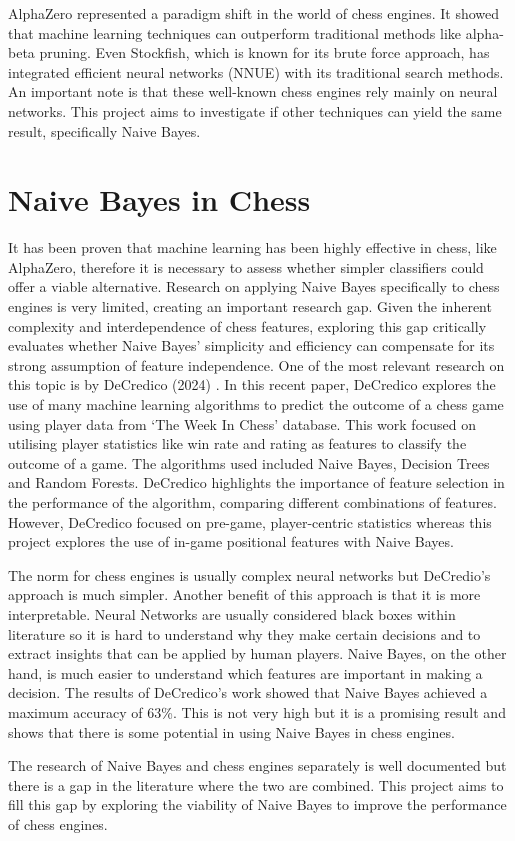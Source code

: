 AlphaZero represented a paradigm shift in the world of chess engines. It showed that machine learning techniques can outperform traditional methods like alpha-beta pruning. Even Stockfish, which is known for its brute force approach, has integrated efficient neural networks (NNUE) with its traditional search methods. An important note is that these well-known chess engines rely mainly on neural networks. This project aims to investigate if other techniques can yield the same result, specifically Naive Bayes. 


\section{Naive Bayes in Chess}

It has been proven that machine learning has been highly effective in chess, like AlphaZero, therefore it is necessary to assess whether simpler classifiers could offer a viable alternative. Research on applying Naive Bayes specifically to chess engines is very limited, creating an important research gap. Given the inherent complexity and interdependence of chess features, exploring this gap critically evaluates whether Naive Bayes' simplicity and efficiency can compensate for its strong assumption of feature independence. One of the most relevant research on this topic is by DeCredico (2024) \cite{decredicoUsingMachineLearning}. In this recent paper, DeCredico explores the use of many machine learning algorithms to predict the outcome of a chess game using player data from `The Week In Chess' database. This work focused on utilising player statistics like win rate and rating as features to classify the outcome of a game. The algorithms used included Naive Bayes, Decision Trees and Random Forests. DeCredico highlights the importance of feature selection in the performance of the algorithm, comparing different combinations of features. However, DeCredico focused on pre-game, player-centric statistics whereas this project explores the use of in-game positional features with Naive Bayes. 

The norm for chess engines is usually complex neural networks but DeCredio's approach is much simpler. Another benefit of this approach is that it is more interpretable. Neural Networks are usually considered black boxes \cite{kleinNeuralNetworksChess2022} \cite{liuInterpretableNeuralNetworks2023} within literature so it is hard to understand why they make certain decisions and to extract insights that can be applied by human players. Naive Bayes, on the other hand, is much easier to understand which features are important in making a decision. The results of DeCredico's work showed that Naive Bayes achieved a maximum accuracy of 63\%. This is not very high but it is a promising result and shows that there is some potential in using Naive Bayes in chess engines. 

The research of Naive Bayes and chess engines separately is well documented but there is a gap in the literature where the two are combined. This project aims to fill this gap by exploring the viability of Naive Bayes to improve the performance of chess engines.
